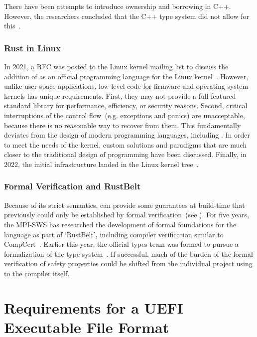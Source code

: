 There have been attempts to introduce  ownership and borrowing in C++. However, the researchers concluded that the C++ type system did not allow for this~\cite{cpp-borrowing-trouble}.

\subsection{Rust in Linux}
\label{sec:rust-linux}

In 2021, a \gls{RFC} was posted to the Linux kernel mailing list to discuss the addition of  as an official programming language for the Linux kernel~\cite{linux-rust}. However, unlike \gls{user-space} applications, low-level code for \gls{firmware} and operating system kernels has unique requirements. First, they may not provide a full-featured standard library for performance, efficiency, or security reasons. Second, critical interruptions of the control flow~(e.g. exceptions and panics) are unacceptable, because there is no reasonable way to recover from them. This fundamentally deviates from the design of modern programming languages, including . In order to meet the needs of the kernel, custom solutions and paradigms that are much closer to the traditional design of  programming have been discussed. Finally, in 2022, the initial  infrastructure landed in the Linux kernel tree~\cite{linux-rust-git}.

\subsection{Formal Verification and RustBelt}

Because of its strict semantics,  can provide some guarantees at build-time that previously could only be established by formal verification~(see ). For five years, the \gls{MPI-SWS} has researched the development of formal foundations for the  language as part of `RustBelt', including compiler verification similar to CompCert~\cite{rustbelt}. Earlier this year, the official  types team was formed to pursue a formalization of the type system~\cite{rust-types-team}. If successful, much of the burden of the formal verification of safety properties could be shifted from the individual project using  to the  compiler itself.

\chapter{Requirements for a UEFI Executable File Format}
\label{chap:uefi_exec_reqs}

